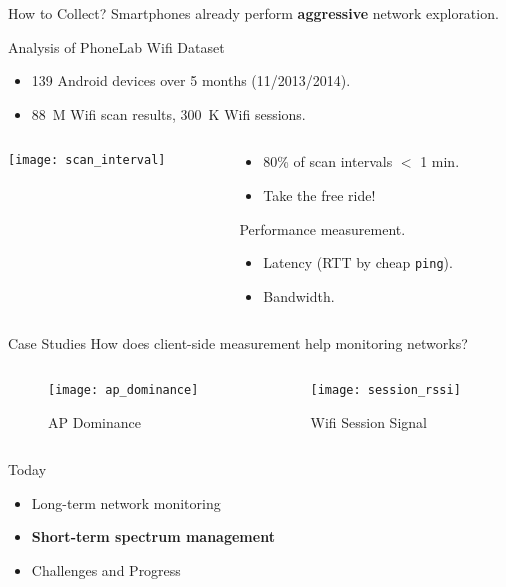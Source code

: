 \begin{frame}{How to Collect?}
  Smartphones already perform \textbf{aggressive} network exploration.
  \begin{block}{Analysis of PhoneLab Wifi Dataset }
    \begin{itemize}
      \item 139 Android devices over 5 months (11/2013/2014).
      \item 88~M Wifi scan results, 300~K Wifi sessions.
    \end{itemize}
  \end{block}

  \begin{columns}[t]
    \begin{column}{0.48\textwidth}
      \vspace{0pt}
      \texttt{[image: scan\_interval]}
    \end{column}%
    \begin{column}{0.52\textwidth}
      \vspace{0pt}
      \begin{itemize}
        \item 80\% of scan intervals $<$ 1 min.
        \item Take the free ride!
      \end{itemize}
      Performance measurement.
      \begin{itemize}
        \item Latency (RTT by cheap \texttt{ping}).
        \item Bandwidth.
      \end{itemize}
    \end{column}
  \end{columns}
\end{frame}

\begin{frame}{Case Studies}
  How does client-side measurement help monitoring networks?
  \begin{columns}
    \begin{column}{0.49\textwidth}
      \vspace{0pt}
      \begin{figure}
        \caption{AP Dominance}
        \texttt{[image: ap\_dominance]}
      \end{figure}
    \end{column}%
    \begin{column}{0.51\textwidth}
      \vspace{0pt}
      \begin{figure}
        \caption{Wifi Session Signal}
        \texttt{[image: session\_rssi]}
      \end{figure}
    \end{column}

  \end{columns}
\end{frame}


\begin{frame}{Today}
  \LARGE
  \begin{itemize}
    \item Long-term network monitoring
    \item \textbf{Short-term spectrum management}
    \item Challenges and Progress
  \end{itemize}
\end{frame}
